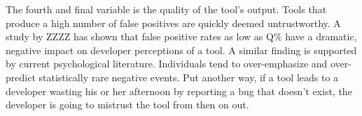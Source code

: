 
The fourth and final variable is the quality of the tool's output.  Tools
that produce a high number of false positives are quickly deemed
untrustworthy.  A study by ZZZZ has shown that false positive rates as low
as Q\% have a dramatic, negative impact on developer perceptions of a tool.
  A similar finding is supported by current psychological
literature.  Individuals tend to over-emphasize and over-predict
statistically rare negative events.  Put another way, if a
tool leads to a developer wasting his or her afternoon by reporting a bug
that doesn't exist, the developer is going to mistrust the tool from then
on out.

% 


